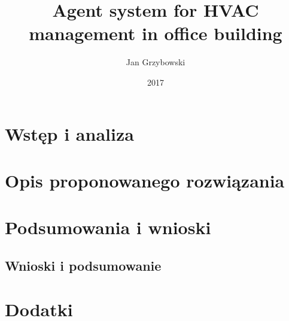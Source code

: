 \documentclass[pl]{minipw} %
\title{Agent system for HVAC management in office building} %
\author{Jan Grzybowski}
\date{2017}
\begin{document}
\sloppy
  
\setcounter{page}{1}

% 


\tableofcontents

\cleardoublepage
\pagestyle{fancy}

\part{Wstęp i analiza}




\part{Opis proponowanego rozwiązania}








\part{Podsumowania i wnioski}
\chapter{Wnioski i podsumowanie}






\part{Dodatki}
\begin{appendices}
   
\end{appendices}


\end{document}
